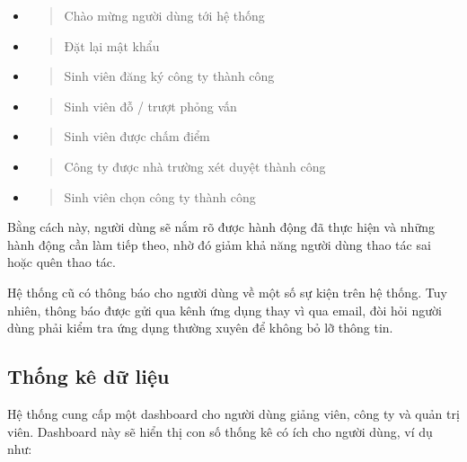\documentclass[./../main.tex]{subfiles}
\begin{document}
\begin{itemize}
\item
  \begin{quote}
  Chào mừng người dùng tới hệ thống
  \end{quote}
\item
  \begin{quote}
  Đặt lại mật khẩu
  \end{quote}
\item
  \begin{quote}
  Sinh viên đăng ký công ty thành công
  \end{quote}
\item
  \begin{quote}
  Sinh viên đỗ / trượt phỏng vấn
  \end{quote}
\item
  \begin{quote}
  Sinh viên được chấm điểm
  \end{quote}
\item
  \begin{quote}
  Công ty được nhà trường xét duyệt thành công
  \end{quote}
\item
  \begin{quote}
  Sinh viên chọn công ty thành công
  \end{quote}
\end{itemize}

Bằng cách này, người dùng sẽ nắm rõ được hành động đã thực hiện và những
hành động cần làm tiếp theo, nhờ đó giảm khả năng người dùng thao tác
sai hoặc quên thao tác.

Hệ thống cũ có thông báo cho người dùng về một số sự kiện trên hệ thống.
Tuy nhiên, thông báo được gửi qua kênh ứng dụng thay vì qua email, đòi
hỏi người dùng phải kiểm tra ứng dụng thường xuyên để không bỏ lỡ thông
tin.

\hypertarget{thux1ed1ng-kuxea-dux1eef-liux1ec7u}{%
\subsection{Thống kê dữ
liệu}\label{thux1ed1ng-kuxea-dux1eef-liux1ec7u}}

Hệ thống cung cấp một dashboard cho người dùng giảng viên, công ty và
quản trị viên. Dashboard này sẽ hiển thị con số thống kê có ích cho
người dùng, ví dụ như:
\end{document}
